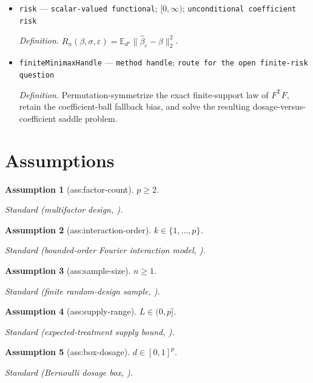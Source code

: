\documentclass{article}
\newtheorem{assumption}{Assumption}
\begin{document}
\begin{itemize}
  \item \texttt{risk} --- \texttt{scalar-\allowbreak{}valued functional}; \([0,\infty)\); \texttt{unconditional coefficient risk}
  \par\smallskip\noindent\emph{Definition.} \(R_n(\beta,\sigma,\varepsilon)=\mathbb E_{d^\star}\|\widehat\beta_{\varepsilon}-\beta\|_2^2\).
  \item \texttt{finiteMinimaxHandle} --- \texttt{method handle}; \texttt{route for the open finite-\allowbreak{}risk question}
  \par\smallskip\noindent\emph{Definition.} Permutation-symmetrize the exact finite-support law of \(F^{\mathsf T}F\), retain the coefficient-ball fallback bias, and solve the resulting dosage-versus-coefficient saddle problem.
\end{itemize}

\section{Assumptions}

\begin{assumption}[ass:factor-count]\label{ass:factor-count}
\(p\ge2\).
\par\smallskip\noindent\emph{Standard} (multifactor design, \cite{ShyamalZhangUhler2025}).
\end{assumption}

\begin{assumption}[ass:interaction-order]\label{ass:interaction-order}
\(k\in\{1,\ldots,p\}\).
\par\smallskip\noindent\emph{Standard} (bounded-order Fourier interaction model, \cite{ShyamalZhangUhler2025}).
\end{assumption}

\begin{assumption}[ass:sample-size]\label{ass:sample-size}
\(n\ge1\).
\par\smallskip\noindent\emph{Standard} (finite random-design sample, \cite{HsuKakadeZhang2014}).
\end{assumption}

\begin{assumption}[ass:supply-range]\label{ass:supply-range}
\(L\in(0,p]\).
\par\smallskip\noindent\emph{Standard} (expected-treatment supply bound, \cite{ShyamalZhangUhler2025}).
\end{assumption}

\begin{assumption}[ass:box-dosage]\label{ass:box-dosage}
\(d\in[0,1]^p\).
\par\smallskip\noindent\emph{Standard} (Bernoulli dosage box, \cite{ShyamalZhangUhler2025}).
\end{assumption}
\end{document}
